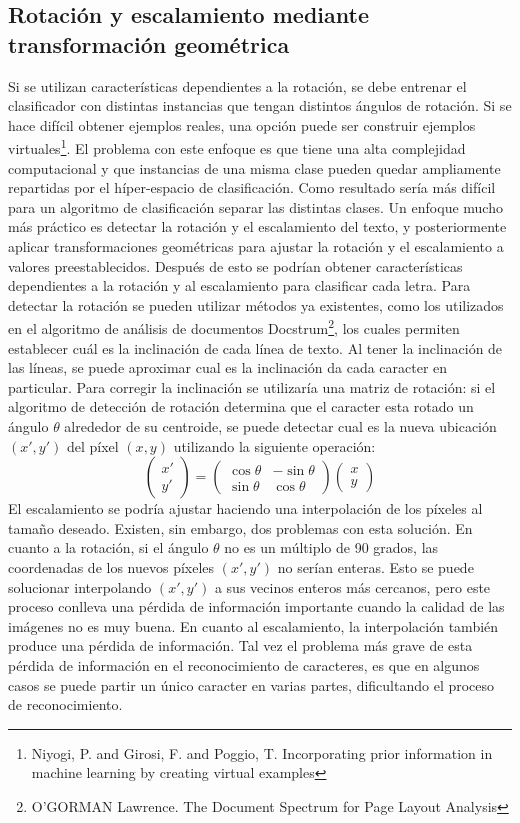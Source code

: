 \documentclass[a4paper, 11pt, oneside]{report}
\begin{document}
\subsection{Rotación y escalamiento mediante transformación geométrica}
\label{sect:rotation}
Si se utilizan características dependientes a la rotación, se debe entrenar el clasificador con distintas instancias que tengan distintos ángulos de rotación. Si se hace difícil obtener ejemplos reales, una opción puede ser construir ejemplos virtuales\footnote{Niyogi, P. and Girosi, F. and Poggio, T. Incorporating prior information in machine learning by creating virtual examples}. El problema con este enfoque es que tiene una alta complejidad computacional y que instancias de una misma clase pueden quedar ampliamente repartidas por el híper-espacio de clasificación. Como resultado sería más difícil para un algoritmo de clasificación separar las distintas clases.
Un enfoque mucho más práctico es detectar la rotación y el escalamiento del texto, y posteriormente aplicar transformaciones geométricas para ajustar la rotación y el escalamiento a valores preestablecidos. Después de esto se podrían obtener características dependientes a la rotación y al escalamiento para clasificar cada letra. Para detectar la rotación se pueden utilizar métodos ya existentes, como los utilizados en el algoritmo de análisis de documentos Docstrum\footnote{O'GORMAN Lawrence. The Document Spectrum for Page Layout Analysis}, los cuales permiten establecer cuál es la inclinación de cada línea de texto. Al tener la inclinación de las líneas, se puede aproximar cual es la inclinación da cada caracter en particular. Para corregir la inclinación se utilizaría una matriz de rotación: si el algoritmo de detección de rotación determina que el caracter esta rotado un ángulo $\theta$ alrededor de su centroide, se puede detectar cual es la nueva ubicación $(x', y')$ del píxel $(x, y)$ utilizando la siguiente operación:
\[
\begin{pmatrix} 
x' \\ y'
\end{pmatrix}
=
\begin{pmatrix} 
\cos\theta & -\sin\theta \\
\sin\theta & \cos\theta
\end{pmatrix}
\begin{pmatrix} 
x \\ y
\end{pmatrix}
\]
El escalamiento se podría ajustar haciendo una interpolación de los píxeles al tamaño deseado. Existen, sin embargo, dos problemas con esta solución. En cuanto a la rotación, si el ángulo $\theta$ no es un múltiplo de 90 grados, las coordenadas de los nuevos píxeles $(x', y')$ no serían enteras. Esto se puede solucionar interpolando $(x',y')$ a sus vecinos enteros más cercanos, pero este proceso conlleva una pérdida de información importante cuando la calidad de las imágenes no es muy buena. En cuanto al escalamiento, la interpolación también produce una pérdida de información. Tal vez el problema más grave de esta pérdida de información en el reconocimiento de caracteres, es que en algunos casos se puede partir un único caracter en varias partes, dificultando el proceso de reconocimiento.
\end{document}
